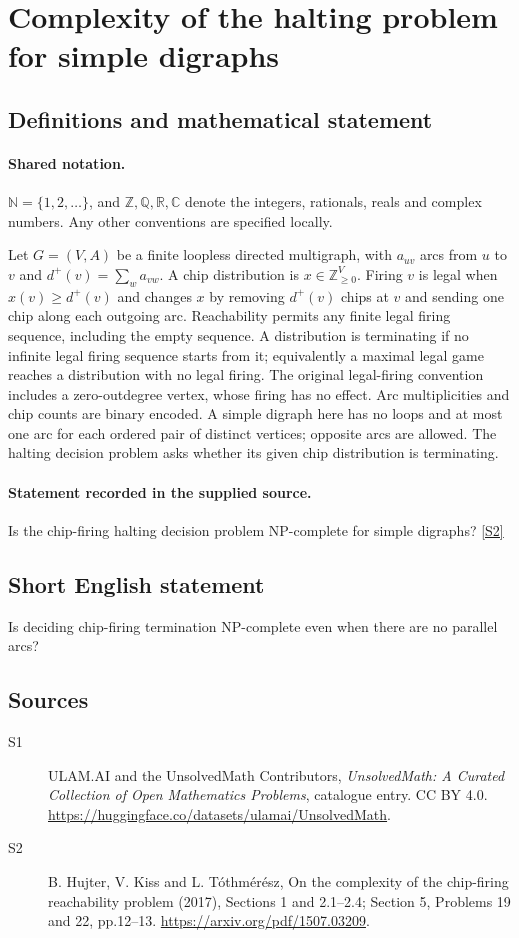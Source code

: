 \documentclass[11pt]{article}
\newcommand{\sref}[2]{\hyperlink{source:#1:#2}{[S#2]}}
\begin{document}
\section{Complexity of the halting problem for simple digraphs}\label{statement}

\subsection{Definitions and mathematical statement}

\paragraph{Shared notation.}$\mathbb N=\{1,2,\ldots\}$, and $\mathbb Z,\mathbb Q,\mathbb R,\mathbb C$ denote the integers, rationals, reals and complex numbers. Any other conventions are specified locally.


Let $G=(V,A)$ be a finite loopless directed multigraph, with $a_{uv}$ arcs from $u$ to $v$ and $d^+(v)=\sum_w a_{vw}$. A chip distribution is $x\in\mathbb Z_{\ge0}^{V}$. Firing $v$ is legal when $x(v)\ge d^+(v)$ and changes $x$ by removing $d^+(v)$ chips at $v$ and sending one chip along each outgoing arc. Reachability permits any finite legal firing sequence, including the empty sequence. A distribution is terminating if no infinite legal firing sequence starts from it; equivalently a maximal legal game reaches a distribution with no legal firing. The original legal-firing convention includes a zero-outdegree vertex, whose firing has no effect. Arc multiplicities and chip counts are binary encoded. A simple digraph here has no loops and at most one arc for each ordered pair of distinct vertices; opposite arcs are allowed. The halting decision problem asks whether its given chip distribution is terminating.
\paragraph{Statement recorded in the supplied source.}
Is the chip-firing halting decision problem NP-complete for simple digraphs? \sref{statement}{2}
\subsection{Short English statement}
Is deciding chip-firing termination NP-complete even when there are no parallel arcs?
\subsection{Sources}
\begin{description}
\item[\hypertarget{source:statement:1}{S1}] ULAM.AI and the UnsolvedMath Contributors, \emph{UnsolvedMath: A Curated Collection of Open Mathematics Problems}, catalogue entry. CC BY 4.0. \url{https://huggingface.co/datasets/ulamai/UnsolvedMath}.
\item[\hypertarget{source:statement:2}{S2}] B. Hujter, V. Kiss and L. Tóthmérész, On the complexity of the chip-firing reachability problem (2017), Sections 1 and 2.1--2.4; Section 5, Problems 19 and 22, pp.12--13. \url{https://arxiv.org/pdf/1507.03209}.
\end{description}
\label{end:statement}
\end{document}
